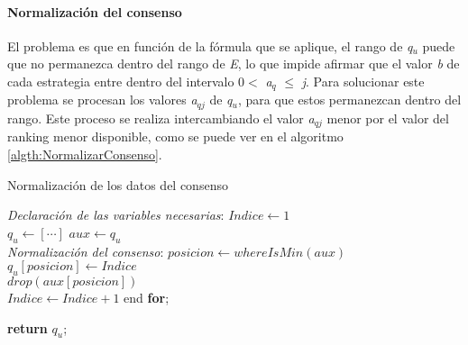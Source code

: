 \newpage

\paragraph{Normalización del consenso}
El problema es que en función de la fórmula que se aplique, el rango de \textit{q$_{u}$} puede que no permanezca dentro del rango de \textit{E}, lo que impide afirmar que el valor \textit{b} de cada estrategia entre dentro del intervalo 0$<$
\textit{a$_{q}$ }$\leq$\textit{ j}. Para solucionar este problema se procesan los valores \textit{a$_{qj}$} de \textit{q$_{u}$}, para que estos permanezcan dentro del rango. Este proceso se realiza intercambiando el valor \textit{a$_{qj}$} menor por el valor del ranking menor disponible, como se puede ver en el algoritmo \ref{algth:NormalizarConsenso}.

\begin{algorithm}[H]
    \caption{Normalización de los datos del consenso}\label{algth:NormalizarConsenso}
    \begin{algorithmic}[1]
            \BState \emph{Declaración de las variables necesarias}:
            \State $Indice \gets 1$
            \\
            \State $q_{u} \gets [\cdots]$
            \State $aux \gets q_{u}$
            \\                
            \BState \emph{Normalización del consenso}:
                \State $posicion \gets whereIsMin(aux)$ 
                \\
                \State $q_{u}[posicion] \gets Indice$ 
                \\
                \State $\textit{drop}(aux[posicion])$ 
                \\
                \State $Indice \gets Indice + 1$ 
            \EndFor
            \State end \textbf{for};

            \State \textbf{return} $q_{u}$;

        \EndProcedure
    \end{algorithmic}
\end{algorithm}

